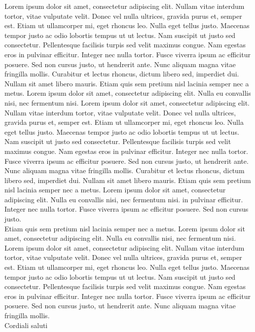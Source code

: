 \documentclass{SISSAletter}
\begin{document}
Lorem ipsum dolor sit amet, consectetur adipiscing elit. Nullam vitae interdum tortor, vitae vulputate velit. Donec vel nulla ultrices, gravida purus et, semper est. Etiam ut ullamcorper mi, eget rhoncus leo. Nulla eget tellus justo. Maecenas tempor justo ac odio lobortis tempus ut ut lectus. Nam suscipit ut justo sed consectetur. Pellentesque facilisis turpis sed velit maximus congue. Nam egestas eros in pulvinar efficitur. Integer nec nulla tortor. Fusce viverra ipsum ac efficitur posuere. Sed non cursus justo, ut hendrerit ante. Nunc aliquam magna vitae fringilla mollis. Curabitur et lectus rhoncus, dictum libero sed, imperdiet dui. Nullam sit amet libero mauris. Etiam quis sem pretium nisl lacinia semper nec a metus. Lorem ipsum dolor sit amet, consectetur adipiscing elit. Nulla eu convallis nisi, nec fermentum nisi. Lorem ipsum dolor sit amet, consectetur adipiscing elit. Nullam vitae interdum tortor, vitae vulputate velit. Donec vel nulla ultrices, gravida purus et, semper est. Etiam ut ullamcorper mi, eget rhoncus leo. Nulla eget tellus justo. Maecenas tempor justo ac odio lobortis tempus ut ut lectus. Nam suscipit ut justo sed consectetur. Pellentesque facilisis turpis sed velit maximus congue. Nam egestas eros in pulvinar efficitur. Integer nec nulla tortor. Fusce viverra ipsum ac efficitur posuere. Sed non cursus justo, ut hendrerit ante. Nunc aliquam magna vitae fringilla mollis. Curabitur et lectus rhoncus, dictum libero sed, imperdiet dui. Nullam sit amet libero mauris. Etiam quis sem pretium nisl lacinia semper nec a metus. Lorem ipsum dolor sit amet, consectetur adipiscing elit. Nulla eu convallis nisi, nec fermentum nisi. in pulvinar efficitur. Integer nec nulla tortor. Fusce viverra ipsum ac efficitur posuere. Sed non cursus justo.
\bigskip \\
Etiam quis sem pretium nisl lacinia semper nec a metus. Lorem ipsum dolor sit amet, consectetur adipiscing elit. Nulla eu convallis nisi, nec fermentum nisi. Lorem ipsum dolor sit amet, consectetur adipiscing elit. Nullam vitae interdum tortor, vitae vulputate velit. Donec vel nulla ultrices, gravida purus et, semper est. Etiam ut ullamcorper mi, eget rhoncus leo. Nulla eget tellus justo. Maecenas tempor justo ac odio lobortis tempus ut ut lectus. Nam suscipit ut justo sed consectetur. Pellentesque facilisis turpis sed velit maximus congue. Nam egestas eros in pulvinar efficitur. Integer nec nulla tortor. Fusce viverra ipsum ac efficitur posuere. Sed non cursus justo, ut hendrerit ante. Nunc aliquam magna vitae fringilla mollis.
\bigskip \\
Cordiali saluti
\end{document}
